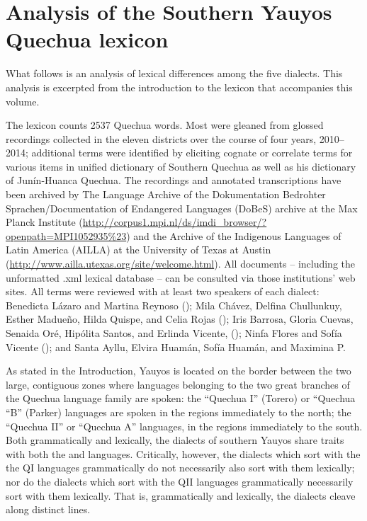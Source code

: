 \chapter{Analysis of the Southern Yauyos Quechua lexicon}

What follows is an analysis of lexical differences among the five dialects. This analysis is excerpted from the introduction to the lexicon that accompanies this volume.

The lexicon counts 2537 Quechua words. Most were gleaned from glossed recordings collected in the eleven districts over the course of four years, 2010--2014; additional terms were identified by eliciting cognate or correlate terms for various items in \citet{CerroP94} unified dictionary of Southern Quechua as well as his \citet{CerroP76b} dictionary of Jun\'in-Huanca Quechua. The recordings and annotated transcriptions have been archived by The Language Archive of the Dokumentation Bedrohter Sprachen/Documentation of Endangered Languages (DoBeS) archive at the Max Planck Institute (\url{http://corpus1.mpi.nl/ds/imdi_browser/?openpath=MPI1052935\%23}) and the Archive of the Indigenous Languages of Latin America (AILLA) at the University of Texas at Austin (\url{http://www.ailla.utexas.org/site/welcome.html}). All documents -- including the unformatted .xml lexical database -- can be consulted via those institutions' web sites. All terms were reviewed with at least two speakers of each dialect: Benedicta L\'azaro and Martina Reynoso (\AH{}); Mila Ch\'avez, Delfina Chullunkuy, Esther Madue\~no, Hilda Quispe, and Celia Rojas (\MV{}); Iris Barrosa, Gloria Cuevas, Senaida Or\'e, Hip\'olita Santos, and Erlinda Vicente, (\CH{}); Ninfa Flores and Sof\'ia Vicente (\LT{}); and Santa Ayllu, Elvira Huam\'an, Sof\'ia Huam\'an, and Maximina P. 

As stated in the Introduction, Yauyos is located on the border between the two large, contiguous zones where languages belonging to the two great branches of the Quechua language family are spoken: the ``Quechua I'' (Torero) or ``Quechua ``B'' (Parker) languages are spoken in the regions immediately to the north; the ``Quechua II'' or ``Quechua A'' languages, in the regions immediately to the south. Both grammatically and lexically, the dialects of southern Yauyos share traits with both the \QI{} and \QII{} languages.  Critically, however, the  dialects which sort with the the QI languages grammatically do not necessarily also sort with them lexically; nor do the dialects which sort with the QII languages grammatically necessarily sort with them lexically. That is, grammatically and lexically, the dialects cleave along distinct lines.

